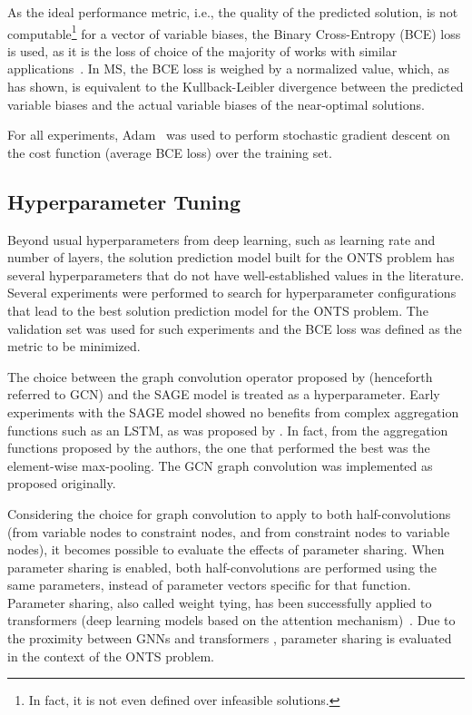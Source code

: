 As the ideal performance metric, i.e., the quality of the predicted solution, is not computable\footnote{In fact, it is not even defined over infeasible solutions.} for a vector of variable biases, the Binary Cross-Entropy (BCE) loss is used, as it is the loss of choice of the majority of works with similar applications~\cite{nairSolvingMixedInteger2021,hanGNNGuidedPredictandSearchFramework2023,khalilMIPGNNDataDrivenFramework2022,gasseExactCombinatorialOptimization2019}.
In MS, the BCE loss is weighed by a normalized value, which, as  has shown, is equivalent to the Kullback-Leibler divergence between the predicted variable biases and the actual variable biases of the near-optimal solutions.

For all experiments, Adam~\cite{kingmaAdamMethodStochastic2015} was used to perform stochastic gradient descent on the cost function (average BCE loss) over the training set.

\subsection{Hyperparameter Tuning}

Beyond usual hyperparameters from deep learning, such as learning rate and number of layers, the solution prediction model built for the ONTS problem has several hyperparameters that do not have well-established values in the literature.
Several experiments were performed to search for hyperparameter configurations that lead to the best solution prediction model for the ONTS problem.
The validation set was used for such experiments and the BCE loss was defined as the metric to be minimized.

The choice between the graph convolution operator proposed by  (henceforth referred to GCN) and the SAGE model is treated as a hyperparameter.
Early experiments with the SAGE model showed no benefits from complex aggregation functions such as an LSTM, as was proposed by .
In fact, from the aggregation functions proposed by the authors, the one that performed the best was the element-wise max-pooling.
The GCN graph convolution was implemented as proposed originally.

Considering the choice for graph convolution to apply to both half-convolutions (from variable nodes to constraint nodes, and from constraint nodes to variable nodes), it becomes possible to evaluate the effects of parameter sharing.
When parameter sharing is enabled, both half-convolutions are performed using the same parameters, instead of parameter vectors specific for that function.
Parameter sharing, also called weight tying, has been successfully applied to transformers (deep learning models based on the attention mechanism)~\cite{inan2017tying,press-wolf-2017-using}.
Due to the proximity between GNNs and transformers \cite{joshiTransformersAreGraph2020}, parameter sharing is evaluated in the context of the ONTS problem.

